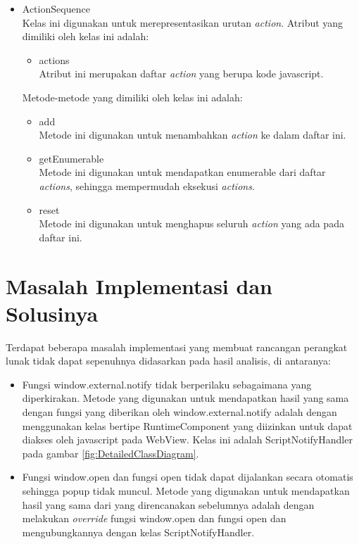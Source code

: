 \begin{itemize}
{    }
    \item{
        ActionSequence\\Kelas ini digunakan untuk merepresentasikan urutan \textit{action}. Atribut yang dimiliki oleh kelas ini adalah:
        \begin{itemize}
            \item{actions\\Atribut ini merupakan daftar \textit{action} yang berupa kode javascript.}
        \end{itemize}
        Metode-metode yang dimiliki oleh kelas ini adalah:
        \begin{itemize}
            \item{add\\Metode ini digunakan untuk menambahkan \textit{action} ke dalam daftar ini.}
            \item{getEnumerable\\Metode ini digunakan untuk mendapatkan enumerable dari daftar \textit{actions}, sehingga mempermudah eksekusi \textit{actions}.}
            \item{reset\\Metode ini digunakan untuk menghapus seluruh \textit{action} yang ada pada daftar ini.}
        \end{itemize}
    }
\end{itemize}



\section{Masalah Implementasi dan Solusinya}
\label{sec:masalah_implementasi}

Terdapat beberapa masalah implementasi yang membuat rancangan perangkat lunak tidak dapat sepenuhnya didasarkan pada hasil analisis, di antaranya:

\begin{itemize}
    \item{Fungsi window.external.notify tidak berperilaku sebagaimana yang diperkirakan. Metode yang digunakan untuk mendapatkan hasil yang sama dengan fungsi yang diberikan oleh window.external.notify adalah dengan menggunakan kelas bertipe RuntimeComponent yang diizinkan untuk dapat diakses oleh javascript pada WebView. Kelas ini adalah ScriptNotifyHandler pada gambar \ref{fig:DetailedClassDiagram}.}
    \item{Fungsi window.open dan fungsi open tidak dapat dijalankan secara otomatis sehingga popup tidak muncul. Metode yang digunakan untuk mendapatkan hasil yang sama dari yang direncanakan sebelumnya adalah dengan melakukan \textit{override} fungsi window.open dan fungsi open dan mengubungkannya dengan kelas ScriptNotifyHandler.}
\end{itemize}